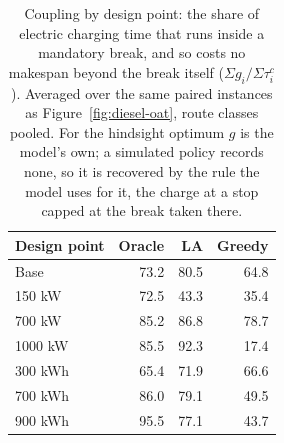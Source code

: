 \begin{table}[ht]\centering
\caption{Coupling by design point: the share of electric charging time that runs inside a mandatory break, and so costs no makespan beyond the break itself ($\Sigma g_i / \Sigma \tau^c_i$).  Averaged over the same paired instances as Figure~\ref{fig:diesel-oat}, route classes pooled.  For the hindsight optimum $g$ is the model's own; a simulated policy records none, so it is recovered by the rule the model uses for it, the charge at a stop capped at the break taken there.}
\label{tab:diesel-oat-coupling}
\begin{tabular}{lrrr}
\hline
Design point & Oracle & LA & Greedy \\
\hline
Base & 73.2 & 80.5 & 64.8 \\
150 kW & 72.5 & 43.3 & 35.4 \\
700 kW & 85.2 & 86.8 & 78.7 \\
1000 kW & 85.5 & 92.3 & 17.4 \\
300 kWh & 65.4 & 71.9 & 66.6 \\
700 kWh & 86.0 & 79.1 & 49.5 \\
900 kWh & 95.5 & 77.1 & 43.7 \\
\hline
\end{tabular}
\end{table}
